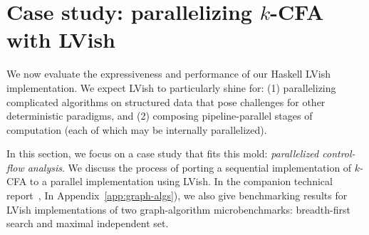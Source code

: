 \section{Case study: parallelizing $k$-CFA with LVish}\label{s:lvish-k-cfa}


We now evaluate 
the expressiveness and performance of our Haskell LVish implementation.
We expect LVish to particularly shine for:
  (1) parallelizing complicated algorithms on structured data that pose 
    challenges for other deterministic paradigms, and 
  (2) composing pipeline-parallel stages of computation 
     (each of which may be internally parallelized).



In this section, we focus on a case study that fits this mold:
\emph{parallelized control-flow analysis}.  We discuss the process of
porting a sequential implementation of $k$-CFA to a parallel
implementation using LVish.
\ifx\fulltr\undefined
In the companion technical
report~\cite{Freeze-TR}, 
\else
In Appendix~\ref{app:graph-algs}),
\fi
we also give benchmarking results for LVish
implementations of two graph-algorithm microbenchmarks: breadth-first
search and maximal independent set.







